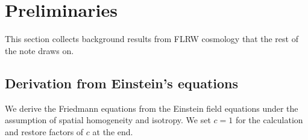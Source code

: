 \documentclass[12pt]{article}
\begin{document}
\section{Preliminaries}
\label{sec:preliminaries}

This section collects background results from FLRW cosmology that the
rest of the note draws on.

\subsection{Derivation from Einstein's equations}
\label{sec:friedmann_derivation}

We derive the Friedmann equations from the Einstein field equations
under the assumption of spatial homogeneity and isotropy.  We set
$c=1$ for the calculation and restore factors of $c$ at the end.
\end{document}
